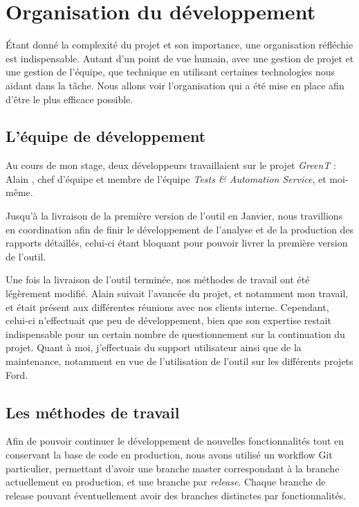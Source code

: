 \chapter{Organisation du développement}\label{chapOrganization}
\putminitoc \'Etant donné la complexité du projet et son importance, une organisation réfléchie est indispensable. Autant d'un point de vue humain, avec une gestion de projet et une gestion de l'équipe, que technique en utilisant certaines technologies nous aidant dans la tâche.  Nous allons voir l'organisation qui a été mise en place afin d'être le plus efficace possible.

\vspace{-25px}
\section{L'équipe de développement}
Au cours de mon stage, deux développeurs travaillaient sur le projet \textit{GreenT} : Alain , chef d’équipe et membre de l’équipe \textit{Tests \& Automation Service}, et moi-même.

Jusqu'à la livraison de la première version de l'outil en Janvier, nous travillions en coordination afin de finir le développement de l'analyse et de la production des rapports détaillés, celui-ci étant bloquant pour pouvoir livrer la première version de l'outil. 

Une fois la livraison de l'outil terminée, nos méthodes de travail ont été légèrement modifié. Alain suivait l'avancée du projet, et notamment mon travail, et était présent aux différentes réunions avec nos clients interne. Cependant, celui-ci n'effectuait que peu de développement, bien que son expertise restait indispensable pour un certain nombre de questionnement sur la continuation du projet. Quant à moi, j'effectuais du support utilisateur ainsi que de la maintenance, notamment en vue de l'utilisation de l'outil sur les différents projets Ford. 

\section{Les méthodes de travail}
Afin de pouvoir continuer le développement de nouvelles fonctionnalités tout en conservant la base de code en production, nous avons utilisé un workflow Git particulier, permettant d'avoir une branche master correspondant à la branche actuellement en production, et une branche par \textit{release}. Chaque branche de release pouvant éventuellement avoir des branches distinctes par fonctionnalités. 

